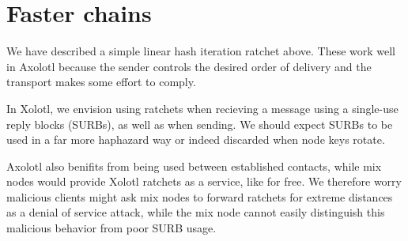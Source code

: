 \documentclass[twoside,letterpaper]{llncs}
\begin{document}
\begin{figure}[b!]%
\end{figure}


\section{Faster chains}

We have described a simple linear hash iteration ratchet above.  
These work well in Axolotl because the sender controls the desired
order of delivery and the transport makes some effort to comply.

In Xolotl, we envision using ratchets when recieving a message 
using a single-use reply blocks (SURBs), as well as when sending.
We should expect SURBs to be used in a far more haphazard way or
indeed discarded when node keys rotate.  

Axolotl also benifits from being used between established contacts,
while mix nodes would provide Xolotl ratchets as a service, like
for free.  We therefore worry malicious clients might ask mix nodes
to forward ratchets for extreme distances as a denial of service
attack, while the mix node cannot easily distinguish this malicious
behavior from poor SURB usage.
\end{document}
